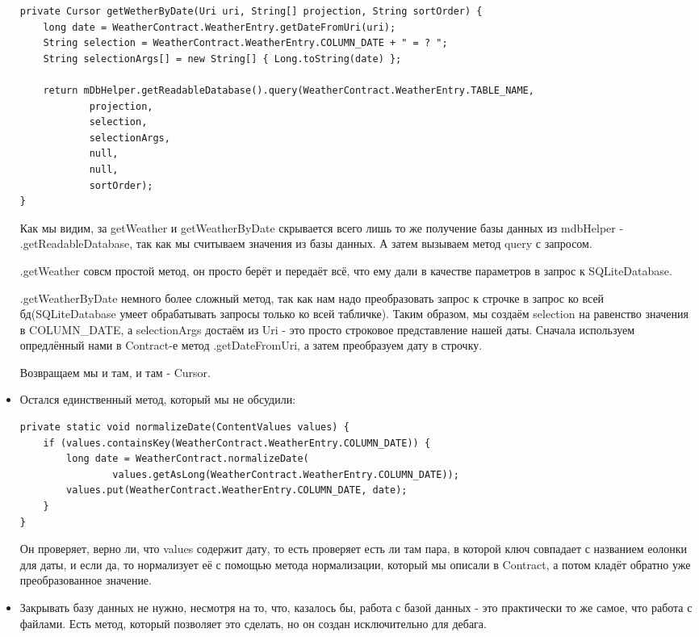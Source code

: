 \documentclass[12 pt]{article}
\begin{document}
\begin{itemize}
\begin{lstlisting}
private Cursor getWetherByDate(Uri uri, String[] projection, String sortOrder) {
    long date = WeatherContract.WeatherEntry.getDateFromUri(uri);
    String selection = WeatherContract.WeatherEntry.COLUMN_DATE + " = ? ";
    String selectionArgs[] = new String[] { Long.toString(date) };

    return mDbHelper.getReadableDatabase().query(WeatherContract.WeatherEntry.TABLE_NAME,
            projection,
            selection,
            selectionArgs,
            null,
            null,
            sortOrder);
}
    	\end{lstlisting}
    	
    	Как мы видим, за getWeather и getWeatherByDate скрывается всего лишь то же получение базы данных из mdbHelper - .getReadableDatabase, так как мы считываем значения из базы данных. А затем вызываем метод query с запросом.
    	
    	.getWeather совсм простой метод, он просто берёт и передаёт всё, что ему дали в качестве параметров в запрос к SQLiteDatabase.
    	
    	.getWeatherByDate немного более сложный метод, так как нам надо преобразовать запрос к строчке в запрос ко всей бд(SQLiteDatabase умеет обрабатывать запросы только ко всей табличке). Таким образом, мы создаём selection на равенство значения в COLUMN\_DATE, а selectionArgs достаём из Uri - это просто строковое представление нашей даты. Сначала используем опредлённый нами в Contract-е метод .getDateFromUri, а затем преобразуем дату в строчку.
    	
    	Возвращаем мы и там, и там - Cursor.
    	\item Остался единственный метод, который мы не обсудили:
    	\begin{lstlisting}
private static void normalizeDate(ContentValues values) {
    if (values.containsKey(WeatherContract.WeatherEntry.COLUMN_DATE)) {
        long date = WeatherContract.normalizeDate(
                values.getAsLong(WeatherContract.WeatherEntry.COLUMN_DATE));
        values.put(WeatherContract.WeatherEntry.COLUMN_DATE, date);
    }
}    	
    	\end{lstlisting}
    	Он проверяет, верно ли, что values содержит дату, то есть проверяет есть ли там пара, в которой ключ совпадает с названием еолонки для даты, и если да, то нормализует её с помощью метода нормализации, который мы описали в Contract, а потом кладёт обратно уже преобразованное значение.
	    \item Закрывать базу данных не нужно, несмотря на то, что, казалось бы, работа с базой данных - это практически то же самое, что работа с файлами. Есть метод, который позволяет это сделать, но он создан исключительно для дебага.
    \end{itemize}
\end{document}
